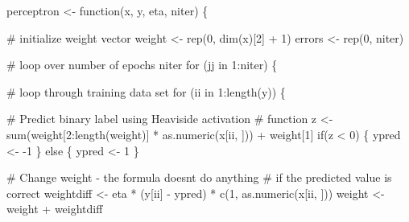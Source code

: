 \documentclass[
  a4paperpaper,
]{article}
\newenvironment{Shaded}{\begin{snugshade}}{\end{snugshade}}
\newcommand{\CommentTok}[1]{\textcolor[rgb]{0.37,0.37,0.37}{#1}}
\newcommand{\ControlFlowTok}[1]{\textcolor[rgb]{0.00,0.23,0.31}{#1}}
\newcommand{\DecValTok}[1]{\textcolor[rgb]{0.68,0.00,0.00}{#1}}
\newcommand{\FunctionTok}[1]{\textcolor[rgb]{0.28,0.35,0.67}{#1}}
\newcommand{\NormalTok}[1]{\textcolor[rgb]{0.00,0.23,0.31}{#1}}
\newcommand{\OtherTok}[1]{\textcolor[rgb]{0.00,0.23,0.31}{#1}}
\newcommand{\SpecialCharTok}[1]{\textcolor[rgb]{0.37,0.37,0.37}{#1}}
\begin{document}
\begin{Shaded}
\begin{Highlighting}[]
\NormalTok{perceptron }\OtherTok{\textless{}{-}} \ControlFlowTok{function}\NormalTok{(x, y, eta, niter) \{}
        
        \CommentTok{\# initialize weight vector}
\NormalTok{        weight }\OtherTok{\textless{}{-}} \FunctionTok{rep}\NormalTok{(}\DecValTok{0}\NormalTok{, }\FunctionTok{dim}\NormalTok{(x)[}\DecValTok{2}\NormalTok{] }\SpecialCharTok{+} \DecValTok{1}\NormalTok{)}
\NormalTok{        errors }\OtherTok{\textless{}{-}} \FunctionTok{rep}\NormalTok{(}\DecValTok{0}\NormalTok{, niter)}
        
        
        \CommentTok{\# loop over number of epochs niter}
        \ControlFlowTok{for}\NormalTok{ (jj }\ControlFlowTok{in} \DecValTok{1}\SpecialCharTok{:}\NormalTok{niter) \{}
                
                \CommentTok{\# loop through training data set}
                \ControlFlowTok{for}\NormalTok{ (ii }\ControlFlowTok{in} \DecValTok{1}\SpecialCharTok{:}\FunctionTok{length}\NormalTok{(y)) \{}
                        
                        \CommentTok{\# Predict binary label using Heaviside activation }
                        \CommentTok{\# function}
\NormalTok{                        z }\OtherTok{\textless{}{-}} \FunctionTok{sum}\NormalTok{(weight[}\DecValTok{2}\SpecialCharTok{:}\FunctionTok{length}\NormalTok{(weight)] }\SpecialCharTok{*} 
                                         \FunctionTok{as.numeric}\NormalTok{(x[ii, ])) }\SpecialCharTok{+}\NormalTok{ weight[}\DecValTok{1}\NormalTok{]}
                        \ControlFlowTok{if}\NormalTok{(z }\SpecialCharTok{\textless{}} \DecValTok{0}\NormalTok{) \{}
\NormalTok{                                ypred }\OtherTok{\textless{}{-}} \SpecialCharTok{{-}}\DecValTok{1}
\NormalTok{                        \} }\ControlFlowTok{else}\NormalTok{ \{}
\NormalTok{                                ypred }\OtherTok{\textless{}{-}} \DecValTok{1}
\NormalTok{                        \}}
                        
                        \CommentTok{\# Change weight {-} the formula doesn\textquotesingle{}t do anything }
                        \CommentTok{\# if the predicted value is correct}
\NormalTok{                        weightdiff }\OtherTok{\textless{}{-}}\NormalTok{ eta }\SpecialCharTok{*}\NormalTok{ (y[ii] }\SpecialCharTok{{-}}\NormalTok{ ypred) }\SpecialCharTok{*} 
                                \FunctionTok{c}\NormalTok{(}\DecValTok{1}\NormalTok{, }\FunctionTok{as.numeric}\NormalTok{(x[ii, ]))}
\NormalTok{                        weight }\OtherTok{\textless{}{-}}\NormalTok{ weight }\SpecialCharTok{+}\NormalTok{ weightdiff}
                        

\end{Highlighting}
\end{Shaded}
\end{document}
